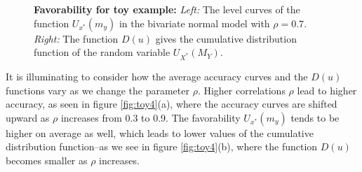\documentclass[twoside,11pt]{article}
\begin{document}
\begin{figure}[h]
\caption{\textbf{Favorability for toy example:}
\emph{Left:} The level curves of the function $U_{x^*}(m_y)$ in the bivariate normal model with $\rho = 0.7$.
\emph{Right:} The function ${D}(u)$ gives the cumulative distribution function of the random variable $U_{X^*}(M_Y)$.}\label{fig:toy3}
\end{figure}

It is illuminating to consider how the average accuracy curves and the
${D}(u)$ functions vary as we change the parameter $\rho$.  Higher
correlations $\rho$ lead to higher accuracy, as seen in figure
\ref{fig:toy4}(a), where the accuracy curves are shifted upward as
$\rho$ increases from 0.3 to 0.9.  The favorability $U_{x^*}(m_y)$
tends to be higher on average as well, which leads to lower values of
the cumulative distribution function--as we see in figure
\ref{fig:toy4}(b), where the function ${D}(u)$ becomes smaller as
$\rho$ increases.
\end{document}
